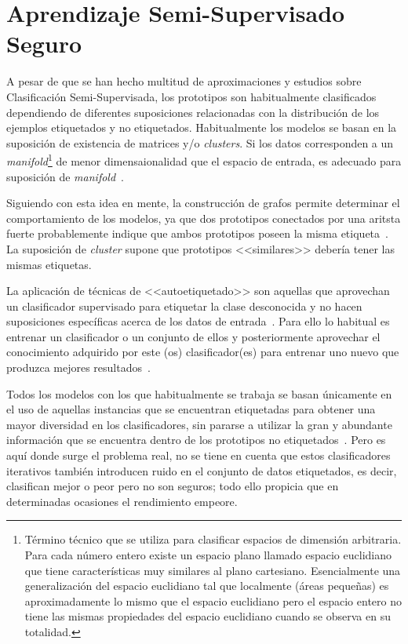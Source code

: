 \section{Aprendizaje Semi-Supervisado Seguro}
A pesar de que se han hecho multitud de aproximaciones y estudios sobre Clasificación Semi-Supervisada, los prototipos son habitualmente clasificados dependiendo de diferentes suposiciones relacionadas con la distribución de los ejemplos etiquetados y no etiquetados. Habitualmente los modelos se basan en la suposición de existencia de matrices y/o \textit{clusters}. Si los datos corresponden a un \textit{manifold}\footnote{Término técnico que se utiliza para clasificar espacios de dimensión arbitraria. Para cada número entero existe un espacio plano llamado espacio euclidiano que tiene características muy similares al plano cartesiano. Esencialmente una generalización del espacio euclidiano tal que localmente (áreas pequeñas) es aproximadamente lo mismo que el espacio euclidiano pero el espacio entero no tiene las mismas propiedades del espacio euclidiano cuando se observa en su totalidad.} de menor dimensaionalidad que el espacio de entrada, es adecuado para suposición de \textit{manifold}~\cite{wang2011solution}.

Siguiendo con esta idea en mente, la construcción de grafos permite determinar el comportamiento de los modelos, ya que dos prototipos conectados por una aritsta fuerte probablemente indique que ambos prototipos poseen la misma etiqueta~\cite{wang2013semi}. La suposición de \textit{cluster} supone que prototipos <<similares>> debería tener las mismas etiquetas.

La aplicación de técnicas de <<autoetiquetado>> son aquellas que aprovechan un clasificador supervisado para etiquetar la clase desconocida y no hacen suposiciones específicas acerca de los datos de entrada~\cite{triguero2015self}. Para ello lo habitual es entrenar un clasificador o un conjunto de ellos y posteriormente aprovechar el conocimiento adquirido por este (os) clasificador(es) para entrenar uno nuevo que produzca mejores resultados~\cite{blum1998combining, zhou2005tri}.

Todos los modelos con los que habitualmente se trabaja se basan únicamente en el uso de aquellas instancias que se encuentran etiquetadas para obtener una mayor diversidad en los clasificadores, sin pararse a utilizar la gran y abundante información que se encuentra dentro de los prototipos no etiquetados~\cite{zhao2021safe}. Pero es aquí donde surge el problema real, no se tiene en cuenta que estos clasificadores iterativos también introducen ruido en el conjunto de datos etiquetados, es decir, clasifican mejor o peor pero no son seguros; todo ello propicia que en determinadas ocasiones el rendimiento empeore.

